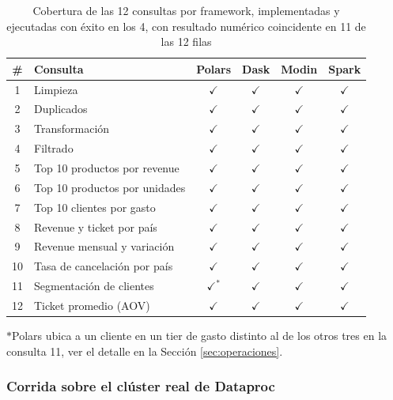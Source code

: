 \begin{table}[H]
\centering
\small
\begin{tabular}{clcccc}
\toprule
\textbf{\#} & \textbf{Consulta} & \textbf{Polars} & \textbf{Dask} & \textbf{Modin} & \textbf{Spark} \\
\midrule
1 & Limpieza & $\checkmark$ & $\checkmark$ & $\checkmark$ & $\checkmark$ \\
2 & Duplicados & $\checkmark$ & $\checkmark$ & $\checkmark$ & $\checkmark$ \\
3 & Transformación & $\checkmark$ & $\checkmark$ & $\checkmark$ & $\checkmark$ \\
4 & Filtrado & $\checkmark$ & $\checkmark$ & $\checkmark$ & $\checkmark$ \\
5 & Top 10 productos por revenue & $\checkmark$ & $\checkmark$ & $\checkmark$ & $\checkmark$ \\
6 & Top 10 productos por unidades & $\checkmark$ & $\checkmark$ & $\checkmark$ & $\checkmark$ \\
7 & Top 10 clientes por gasto & $\checkmark$ & $\checkmark$ & $\checkmark$ & $\checkmark$ \\
8 & Revenue y ticket por país & $\checkmark$ & $\checkmark$ & $\checkmark$ & $\checkmark$ \\
9 & Revenue mensual y variación & $\checkmark$ & $\checkmark$ & $\checkmark$ & $\checkmark$ \\
10 & Tasa de cancelación por país & $\checkmark$ & $\checkmark$ & $\checkmark$ & $\checkmark$ \\
11 & Segmentación de clientes & $\checkmark^{\ast}$ & $\checkmark$ & $\checkmark$ & $\checkmark$ \\
12 & Ticket promedio (AOV) & $\checkmark$ & $\checkmark$ & $\checkmark$ & $\checkmark$ \\
\bottomrule
\end{tabular}
\caption{Cobertura de las 12 consultas por framework, implementadas y ejecutadas con éxito en los 4, con resultado numérico coincidente en 11 de las 12 filas}
\label{tab:cobertura}
\end{table}

{\footnotesize $\ast$Polars ubica a un cliente en un tier de gasto distinto al de los otros tres en la consulta 11, ver el detalle en la Sección \ref{sec:operaciones}.}

\subsubsection*{Corrida sobre el clúster real de Dataproc}
\label{sec:gcp-cluster-run}

